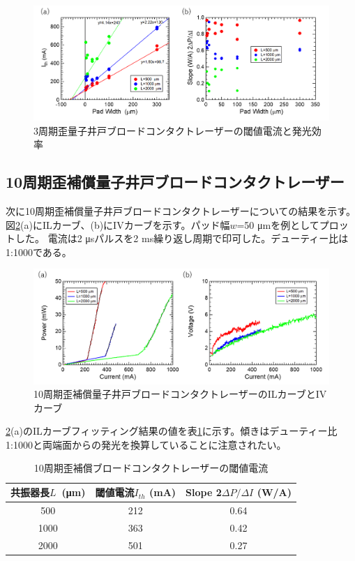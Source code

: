 \begin{figure}[h]
	\centering
	\includegraphics[width=15cm]{figure/fig_3_1_3QW_broadcontact_Ith.png}
		\caption{3周期歪量子井戸ブロードコンタクトレーザーの閾値電流と発光効率}
		\label{fig:fig_3_1_3QW_broadcontact_Ith}
\end{figure}
\clearpage
\subsection{10周期歪補償量子井戸ブロードコンタクトレーザー}%
次に10周期歪補償量子井戸ブロードコンタクトレーザーについての結果を示す。図\ref{fig:fig_3_1_10QW_broadcontact_IL}(a)にILカーブ、(b)にIVカーブを示す。パッド幅$w$=50 \si{\micro\metre}を例としてプロットした。
電流は2 \si{\micro s}パルスを2 ms繰り返し周期で印可した。デューティー比は1:1000である。
\begin{figure}[h]
	\centering
	\includegraphics[width=15cm]{figure/fig_3_1_10QW_broadcontact_IL.png}
		\caption{10周期歪補償量子井戸ブロードコンタクトレーザーのILカーブとIVカーブ}
		\label{fig:fig_3_1_10QW_broadcontact_IL}
\end{figure}

\ref{fig:fig_3_1_10QW_broadcontact_IL}(a)のILカーブフィッティング結果の値を表\ref{table:table_3_1_10QW_broadcontact}に示す。傾きはデューティー比1:1000と両端面からの発光を換算していることに注意されたい。
\begin{table}[h]
  \caption{10周期歪補償ブロードコンタクトレーザーの閾値電流}
  \label{table:table_3_1_10QW_broadcontact}
  \centering
  \begin{tabular}{ccc}
    \hline
    共振器長$L$\ (\si{\micro\metre})  & 閾値電流$I_{th}$ (mA)  & Slope 2$\Delta P/\Delta I$ (W/A) \\
    \hline \hline
     500& 212&  0.64  \\
    1000& 363& 0.42\\
    2000& 501&0.27\\
       \hline
  \end{tabular}
\end{table}

